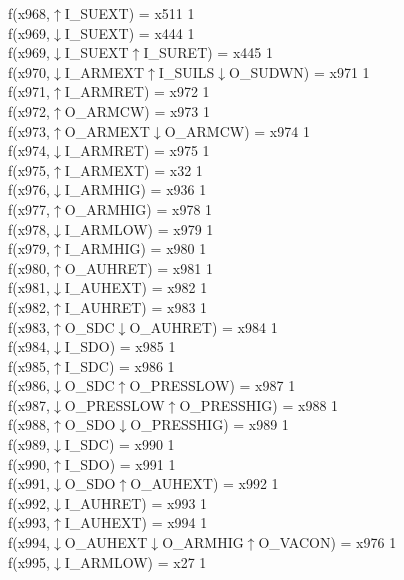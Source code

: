 f(x968,$\uparrow$I\_SUEXT) = x511 {1} \\
f(x969,$\downarrow$I\_SUEXT) = x444 {1} \\
f(x969,$\downarrow$I\_SUEXT$\uparrow$I\_SURET) = x445 {1} \\
f(x970,$\downarrow$I\_ARMEXT$\uparrow$I\_SUILS$\downarrow$O\_SUDWN) = x971 {1} \\
f(x971,$\uparrow$I\_ARMRET) = x972 {1} \\
f(x972,$\uparrow$O\_ARMCW) = x973 {1} \\
f(x973,$\uparrow$O\_ARMEXT$\downarrow$O\_ARMCW) = x974 {1} \\
f(x974,$\downarrow$I\_ARMRET) = x975 {1} \\
f(x975,$\uparrow$I\_ARMEXT) = x32 {1} \\
f(x976,$\downarrow$I\_ARMHIG) = x936 {1} \\
f(x977,$\uparrow$O\_ARMHIG) = x978 {1} \\
f(x978,$\downarrow$I\_ARMLOW) = x979 {1} \\
f(x979,$\uparrow$I\_ARMHIG) = x980 {1} \\
f(x980,$\uparrow$O\_AUHRET) = x981 {1} \\
f(x981,$\downarrow$I\_AUHEXT) = x982 {1} \\
f(x982,$\uparrow$I\_AUHRET) = x983 {1} \\
f(x983,$\uparrow$O\_SDC$\downarrow$O\_AUHRET) = x984 {1} \\
f(x984,$\downarrow$I\_SDO) = x985 {1} \\
f(x985,$\uparrow$I\_SDC) = x986 {1} \\
f(x986,$\downarrow$O\_SDC$\uparrow$O\_PRESSLOW) = x987 {1} \\
f(x987,$\downarrow$O\_PRESSLOW$\uparrow$O\_PRESSHIG) = x988 {1} \\
f(x988,$\uparrow$O\_SDO$\downarrow$O\_PRESSHIG) = x989 {1} \\
f(x989,$\downarrow$I\_SDC) = x990 {1} \\
f(x990,$\uparrow$I\_SDO) = x991 {1} \\
f(x991,$\downarrow$O\_SDO$\uparrow$O\_AUHEXT) = x992 {1} \\
f(x992,$\downarrow$I\_AUHRET) = x993 {1} \\
f(x993,$\uparrow$I\_AUHEXT) = x994 {1} \\
f(x994,$\downarrow$O\_AUHEXT$\downarrow$O\_ARMHIG$\uparrow$O\_VACON) = x976 {1} \\
f(x995,$\downarrow$I\_ARMLOW) = x27 {1} \\
